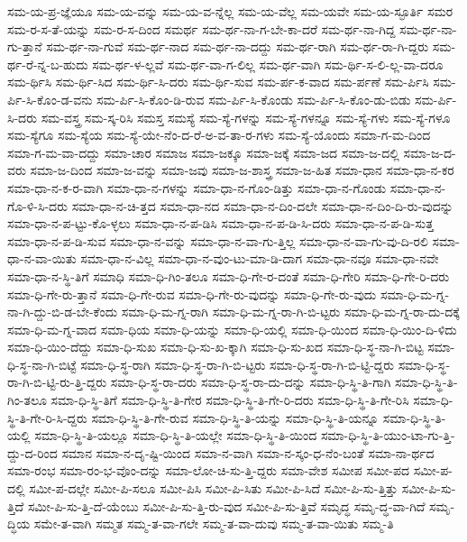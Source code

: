 {ಸಮ-ಯ-ಪ್ರ-ಜ್ಞೆಯೂ
ಸಮ-ಯ-ವನ್ನು
ಸಮ-ಯ-ವ-ನ್ನೆಲ್ಲ
ಸಮ-ಯ-ವೆಲ್ಲ
ಸಮ-ಯವೇ
ಸಮ-ಯ-ಸ್ಫೂರ್ತಿ
ಸಮರ
ಸಮ-ರ-ಸ-ತೆ-ಯನ್ನು
ಸಮ-ರ-ಸ-ದಿಂದ
ಸಮರ್ಥ
ಸಮ-ರ್ಥ-ನಾ-ಗ-ಬೇ-ಕಾ-ದರೆ
ಸಮ-ರ್ಥ-ನಾ-ಗಿದ್ದ
ಸಮ-ರ್ಥ-ನಾ-ಗು-ತ್ತಾನೆ
ಸಮ-ರ್ಥ-ನಾ-ಗುವೆ
ಸಮ-ರ್ಥ-ನಾದ
ಸಮ-ರ್ಥ-ನಾ-ದದ್ದು
ಸಮ-ರ್ಥ-ರಾಗಿ
ಸಮ-ರ್ಥ-ರಾ-ಗಿ-ದ್ದರು
ಸಮ-ರ್ಥ-ರೆ-ನ್ನ-ಬ-ಹುದು
ಸಮ-ರ್ಥ-ಳ-ಲ್ಲವೆ
ಸಮ-ರ್ಥ-ವಾ-ಗ-ಲಿಲ್ಲ
ಸಮ-ರ್ಥ-ವಾಗಿ
ಸಮ-ರ್ಥಿ-ಸ-ಲಿ-ಲ್ಲ-ವಾ-ದರೂ
ಸಮ-ರ್ಥಿಸಿ
ಸಮ-ರ್ಥಿ-ಸಿದ
ಸಮ-ರ್ಥಿ-ಸಿ-ದರು
ಸಮ-ರ್ಥಿ-ಸುವ
ಸಮ-ರ್ಪ-ಕ-ವಾದ
ಸಮ-ರ್ಪಣೆ
ಸಮ-ರ್ಪಿಸಿ
ಸಮ-ರ್ಪಿ-ಸಿ-ಕೊಂ-ಡ-ವನು
ಸಮ-ರ್ಪಿ-ಸಿ-ಕೊಂ-ಡಿ-ರುವ
ಸಮ-ರ್ಪಿ-ಸಿ-ಕೊಂಡು
ಸಮ-ರ್ಪಿ-ಸಿ-ಕೊಂ-ಡು-ಬಿಡು
ಸಮ-ರ್ಪಿ-ಸಿ-ದರು
ಸಮ-ವಸ್ತ್ರ
ಸಮ-ಸ್ಕ-ರಿಸಿ
ಸಮಸ್ತ
ಸಮಸ್ಯೆ
ಸಮ-ಸ್ಯೆ-ಗಳನ್ನು
ಸಮ-ಸ್ಯೆ-ಗಳನ್ನೂ
ಸಮ-ಸ್ಯೆ-ಗಳು
ಸಮ-ಸ್ಯೆ-ಗಳೂ
ಸಮ-ಸ್ಯೆಗೂ
ಸಮ-ಸ್ಯೆಯ
ಸಮ-ಸ್ಯೆ-ಯೇ-ನೆಂ-ದ-ರೆ-ಅ-ವ-ತಾ-ರ-ಗಳು
ಸಮ-ಸ್ಯೆ-ಯೊಂದು
ಸಮಾ-ಗ-ಮ-ದಿಂದ
ಸಮಾ-ಗ-ಮ-ವಾ-ದದ್ದು
ಸಮಾ-ಚಾರ
ಸಮಾಜ
ಸಮಾ-ಜಕ್ಕೂ
ಸಮಾ-ಜಕ್ಕೆ
ಸಮಾ-ಜದ
ಸಮಾ-ಜ-ದಲ್ಲಿ
ಸಮಾ-ಜ-ದ-ವರು
ಸಮಾ-ಜ-ದಿಂದ
ಸಮಾ-ಜ-ವನ್ನು
ಸಮಾ-ಜವು
ಸಮಾ-ಜ-ಶಾಸ್ತ್ರ
ಸಮಾ-ಜ-ಹಿತ
ಸಮಾ-ಧಾನ
ಸಮಾ-ಧಾ-ನ-ಕರ
ಸಮಾ-ಧಾ-ನ-ಕ-ರ-ವಾಗಿ
ಸಮಾ-ಧಾ-ನ-ಗಳನ್ನು
ಸಮಾ-ಧಾ-ನ-ಗೊಂ-ಡಿತ್ತು
ಸಮಾ-ಧಾ-ನ-ಗೊಂಡು
ಸಮಾ-ಧಾ-ನ-ಗೊ-ಳಿ-ಸಿ-ದರು
ಸಮಾ-ಧಾ-ನ-ಚಿ-ತ್ತದ
ಸಮಾ-ಧಾ-ನದ
ಸಮಾ-ಧಾ-ನ-ದಿಂ-ದಲೇ
ಸಮಾ-ಧಾ-ನ-ದಿಂ-ದಿ-ರು-ವುದನ್ನು
ಸಮಾ-ಧಾ-ನ-ಪ-ಟ್ಟು-ಕೊ-ಳ್ಳಲು
ಸಮಾ-ಧಾ-ನ-ಪ-ಡಿಸಿ
ಸಮಾ-ಧಾ-ನ-ಪ-ಡಿ-ಸಿ-ದರು
ಸಮಾ-ಧಾ-ನ-ಪ-ಡಿ-ಸುತ್ತ
ಸಮಾ-ಧಾ-ನ-ಪ-ಡಿ-ಸುವ
ಸಮಾ-ಧಾ-ನ-ವನ್ನು
ಸಮಾ-ಧಾ-ನ-ವಾ-ಗು-ತ್ತಿಲ್ಲ
ಸಮಾ-ಧಾ-ನ-ವಾ-ಗು-ವು-ದಿ-ರಲಿ
ಸಮಾ-ಧಾ-ನ-ವಾ-ಯಿತು
ಸಮಾ-ಧಾ-ನ-ವಿಲ್ಲ
ಸಮಾ-ಧಾ-ನ-ವುಂ-ಟು-ಮಾ-ಡಿ-ದಾಗ
ಸಮಾ-ಧಾ-ನವೂ
ಸಮಾ-ಧಾ-ನವೇ
ಸಮಾ-ಧಾ-ನ-ಸ್ಥಿ-ತಿಗೆ
ಸಮಾಧಿ
ಸಮಾ-ಧಿ-ಗಿಂ-ತಲೂ
ಸಮಾ-ಧಿ-ಗೇ-ರ-ದಂತೆ
ಸಮಾ-ಧಿ-ಗೇರಿ
ಸಮಾ-ಧಿ-ಗೇ-ರಿ-ದರು
ಸಮಾ-ಧಿ-ಗೇ-ರು-ತ್ತಾನೆ
ಸಮಾ-ಧಿ-ಗೇ-ರುವ
ಸಮಾ-ಧಿ-ಗೇ-ರು-ವುದನ್ನು
ಸಮಾ-ಧಿ-ಗೇ-ರು-ವುದು
ಸಮಾ-ಧಿ-ಮ-ಗ್ನ-ನಾ-ಗಿ-ದ್ದು-ಬಿ-ಡ-ಬೇ-ಕೆಂದು
ಸಮಾ-ಧಿ-ಮ-ಗ್ನ-ರಾಗಿ
ಸಮಾ-ಧಿ-ಮ-ಗ್ನ-ರಾ-ಗಿ-ಬಿ-ಟ್ಟರು
ಸಮಾ-ಧಿ-ಮ-ಗ್ನ-ರಾ-ದು-ದಕ್ಕೆ
ಸಮಾ-ಧಿ-ಮ-ಗ್ನ-ವಾದ
ಸಮಾ-ಧಿಯ
ಸಮಾ-ಧಿ-ಯನ್ನು
ಸಮಾ-ಧಿ-ಯಲ್ಲಿ
ಸಮಾ-ಧಿ-ಯಿಂದ
ಸಮಾ-ಧಿ-ಯಿಂ-ದಿ-ಳಿದು
ಸಮಾ-ಧಿ-ಯಿಂ-ದೆದ್ದು
ಸಮಾ-ಧಿ-ಸುಖ
ಸಮಾ-ಧಿ-ಸು-ಖ-ಕ್ಕಾಗಿ
ಸಮಾ-ಧಿ-ಸು-ಖದ
ಸಮಾ-ಧಿ-ಸ್ಥ-ನಾ-ಗಿ-ಬಿಟ್ಟ
ಸಮಾ-ಧಿ-ಸ್ಥ-ನಾ-ಗಿ-ಬಿಟ್ಟೆ
ಸಮಾ-ಧಿ-ಸ್ಥ-ರಾಗಿ
ಸಮಾ-ಧಿ-ಸ್ಥ-ರಾ-ಗಿ-ಬಿ-ಟ್ಟರು
ಸಮಾ-ಧಿ-ಸ್ಥ-ರಾ-ಗಿ-ಬಿ-ಟ್ಟಿ-ದ್ದರು
ಸಮಾ-ಧಿ-ಸ್ಥ-ರಾ-ಗಿ-ಬಿ-ಟ್ಟಿ-ರು-ತ್ತಿ-ದ್ದರು
ಸಮಾ-ಧಿ-ಸ್ಥ-ರಾ-ದರು
ಸಮಾ-ಧಿ-ಸ್ಥ-ರಾ-ದು-ದನ್ನು
ಸಮಾ-ಧಿ-ಸ್ಥಿ-ತಿ-ಗಾಗಿ
ಸಮಾ-ಧಿ-ಸ್ಥಿ-ತಿ-ಗಿಂ-ತಲೂ
ಸಮಾ-ಧಿ-ಸ್ಥಿ-ತಿಗೆ
ಸಮಾ-ಧಿ-ಸ್ಥಿ-ತಿ-ಗೇರ
ಸಮಾ-ಧಿ-ಸ್ಥಿ-ತಿ-ಗೇ-ರಿ-ದರು
ಸಮಾ-ಧಿ-ಸ್ಥಿ-ತಿ-ಗೇ-ರಿಸಿ
ಸಮಾ-ಧಿ-ಸ್ಥಿ-ತಿ-ಗೇ-ರಿ-ಸಿ-ದ್ದರು
ಸಮಾ-ಧಿ-ಸ್ಥಿ-ತಿ-ಗೇ-ರುವ
ಸಮಾ-ಧಿ-ಸ್ಥಿ-ತಿ-ಯನ್ನು
ಸಮಾ-ಧಿ-ಸ್ಥಿ-ತಿ-ಯನ್ನೂ
ಸಮಾ-ಧಿ-ಸ್ಥಿ-ತಿ-ಯಲ್ಲಿ
ಸಮಾ-ಧಿ-ಸ್ಥಿ-ತಿ-ಯಲ್ಲೂ
ಸಮಾ-ಧಿ-ಸ್ಥಿ-ತಿ-ಯಲ್ಲೇ
ಸಮಾ-ಧಿ-ಸ್ಥಿ-ತಿ-ಯಿಂದ
ಸಮಾ-ಧಿ-ಸ್ಥಿ-ತಿ-ಯುಂ-ಟಾ-ಗು-ತ್ತಿ-ದ್ದು-ದ-ರಿಂದ
ಸಮಾನ
ಸಮಾ-ನ-ದೃ-ಷ್ಟಿ-ಯಿಂದ
ಸಮಾ-ನ-ವಾಗಿ
ಸಮಾ-ನ-ಸ್ಕಂ-ಧ-ನೆಂ-ಬಂತೆ
ಸಮಾ-ನಾ-ರ್ಥದ
ಸಮಾ-ರಂಭ
ಸಮಾ-ರಂ-ಭ-ವೊಂ-ದನ್ನು
ಸಮಾ-ಲೋ-ಚಿ-ಸು-ತ್ತಿ-ದ್ದರು
ಸಮಾ-ವೇಶ
ಸಮೀಪ
ಸಮೀ-ಪದ
ಸಮೀ-ಪ-ದಲ್ಲಿ
ಸಮೀ-ಪ-ದಲ್ಲೇ
ಸಮೀ-ಪಿ-ಸಲೂ
ಸಮೀ-ಪಿಸಿ
ಸಮೀ-ಪಿ-ಸಿತು
ಸಮೀ-ಪಿ-ಸಿದೆ
ಸಮೀ-ಪಿ-ಸು-ತ್ತಿತ್ತು
ಸಮೀ-ಪಿ-ಸು-ತ್ತಿದೆ
ಸಮೀ-ಪಿ-ಸು-ತ್ತಿ-ದೆ-ಯೆಂಬು
ಸಮೀ-ಪಿ-ಸು-ತ್ತಿ-ರು-ವುದ
ಸಮೀ-ಪಿ-ಸು-ತ್ತಿವೆ
ಸಮೃದ್ಧ
ಸಮೃ-ದ್ಧ-ವಾ-ಗಿದೆ
ಸಮೃ-ದ್ಧಿಯ
ಸಮೇ-ತ-ವಾಗಿ
ಸಮ್ಮತ
ಸಮ್ಮ-ತ-ವಾ-ಗಲೇ
ಸಮ್ಮ-ತ-ವಾ-ದುವು
ಸಮ್ಮ-ತ-ವಾ-ಯಿತು
ಸಮ್ಮ-ತಿ
}
